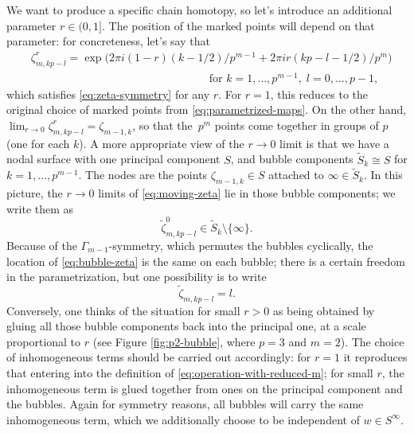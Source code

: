 \documentclass[JEP,XML,SOM,Unicode,NoFloatCountersInSection,published]{cedram}
\theoremstyle{plain}
\theoremstyle{definition}
\let\iso\cong
\begin{document}
We want to produce a specific chain homotopy, so let's introduce an additional parameter $r \in (0,1]$. The position of the marked points will depend on that parameter: for concreteness, let's say that\enlargethispage{-\baselineskip}
\begin{equation}\label{eq:moving-zeta}
\begin{aligned}
&\zeta_{m,kp-l}^r = \exp\bigl(2\pi i (1-r) (k-1/2)/p^{m-1} + 2\pi i r (kp-l-1/2)/p^m \bigr)
\\
& \qquad \qquad \qquad \qquad \qquad \qquad \qquad \qquad \text{for } k = 1,\dots,p^{m-1}, \; l = 0,\dots,p-1,
\end{aligned}
\end{equation}
which satisfies \eqref{eq:zeta-symmetry} for any $r$. For $r = 1$, this reduces to the original choice of marked points from \eqref{eq:parametrized-maps}. On the other hand, $\lim_{r \to 0} \zeta_{m,kp-l}^r = \zeta_{m-1,k}$, so that the~$p^m$ points come together in groups of $p$ (one for each $k$). A more appropriate view of the $r \to 0$ limit is that we have a nodal surface with one principal component $S$, and bubble components $\tilde{S}_k \iso S$ for $k = 1,\dots,p^{m-1}$. The nodes are the points $\zeta_{m-1,k} \in S$ attached to $\infty \in \tilde{S}_k$. In this picture, the $r \to 0$ limits of \eqref{eq:moving-zeta} lie in those bubble components; we write them as
\begin{equation}\label{eq:bubble-zeta}
\tilde\zeta_{m,kp-l}^0 \in \tilde{S}_k \setminus \{\infty\}.
\end{equation}
Because of the $\Gamma_{m-1}$-symmetry, which permutes the bubbles cyclically, the location of \eqref{eq:bubble-zeta} is the same on each bubble; there is a certain freedom in the parametrization, but one possibility is to write
\begin{equation}\label{eq:bubble-points}
\tilde\zeta_{m,kp-l} = l.
\end{equation}
Conversely, one thinks of the situation for small $r>0$ as being obtained by gluing all those bubble components back into the principal one, at a scale proportional to $r$ (see Figure \ref{fig:p2-bubble}, where $p = 3$ and $m = 2$). The choice of inhomogeneous terms should be carried out accordingly: for $r = 1$ it reproduces that entering into the definition of \eqref{eq:operation-with-reduced-m}; for small $r$, the inhomogeneous term is glued together from ones on the principal component and the bubbles. Again for symmetry reasons, all bubbles will carry the same inhomogeneous term, which we additionally choose to be independent of $w \in S^\infty$.
\end{document}
